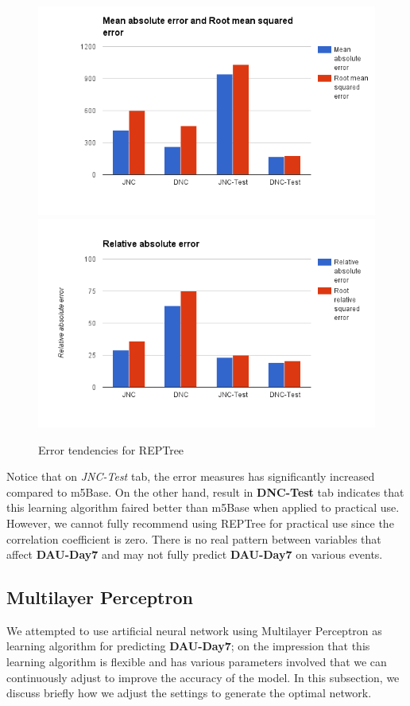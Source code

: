 \begin{figure}[h]
\centering
\includegraphics[scale=0.3]{figures/REPTree_2.png} 
\includegraphics[scale=0.3]{figures/REPTree_3.png} 
\caption{Error tendencies for REPTree}
\label{fig:error_reptree}
\end{figure}

Notice that on \textit{JNC-Test} tab, the error measures has significantly increased compared to m5Base. On the other hand, result in \textbf{DNC-Test} tab indicates that this learning algorithm faired better than m5Base when applied to practical use. However, we cannot fully recommend using REPTree for practical use since the correlation coefficient is zero. There is no real pattern between variables that affect \textbf{DAU-Day7} and may not fully predict \textbf{DAU-Day7} on various events.

\subsection{Multilayer Perceptron}
We attempted to use artificial neural network using Multilayer Perceptron as learning algorithm for predicting \textbf{DAU-Day7}; on the impression that this learning algorithm is flexible and has various parameters involved that we can continuously adjust to improve the accuracy of the model. In this subsection, we discuss briefly how we adjust the settings to generate the optimal network.

